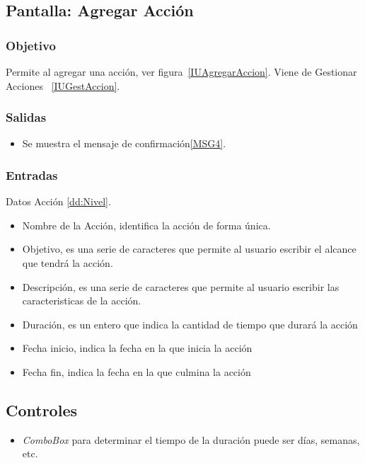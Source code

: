 \subsection{Pantalla: Agregar Acción}

\subsubsection{Objetivo}
Permite al agregar una acción, ver figura~\ref{IUAgregarAccion}. Viene de Gestionar Acciones ~\ref{IUGestAccion}.


\subsubsection{Salidas}
\begin{itemize}
 \item Se muestra el mensaje de confirmación\ref{MSG4}.
 \end{itemize}

\subsubsection{Entradas}
Datos Acción \ref{dd:Nivel}.
\begin{itemize}
 \item Nombre de la Acción, identifica la acción de forma única.
 \item Objetivo, es una serie de caracteres que permite al usuario escribir el alcance que tendrá la acción.
 \item Descripción, es una serie de caracteres que permite al usuario escribir las caracteristicas de la acción.
 \item Duración, es un entero que indica la cantidad de tiempo que durará la acción
 \item Fecha inicio, indica la fecha en la que inicia la acción
 \item Fecha fin, indica la fecha en la que culmina la acción

\end{itemize}

\subsection{Controles}
\begin{itemize}
 \item \textit{ComboBox} para determinar el tiempo de la duración puede ser días, semanas, etc.
\end{itemize}

